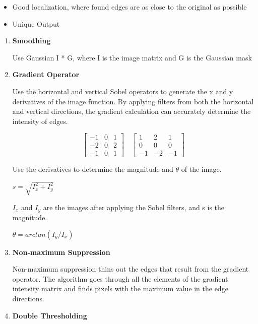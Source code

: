 \documentclass{article}
\begin{document}
\begin{multicols}{2}
\begin{itemize}
      \item Good localization, where found edges are as close to the original as possible
  
      \item Unique Output
\end{itemize}

\begin{enumerate}
        \item \textbf{Smoothing}
        
        Use Gaussian I * G, where I is the image matrix and G is the Gaussian mask
        \item \textbf{Gradient Operator}
        
        Use the horizontal and vertical Sobel operators to generate the x and y derivatives of the image function.
        By applying filters from both the horizontal and vertical directions, the gradient calculation can accurately determine the intensity of edges.

        \[
          \begin{bmatrix}
            -1 & 0 & 1\\
            -2 & 0 & 2\\
            -1 & 0 & 1
          \end{bmatrix}\quad
          \begin{bmatrix}
            1 & 2 & 1\\
            0 & 0 & 0\\
            -1 & -2 & -1
          \end{bmatrix}
        \]

        Use the derivatives to determine the magnitude and $\theta$ of the image.
        
        $s = \sqrt{I_x^2 + I_y^2}$

        $I_x$ and $I_y$ are the images after applying the Sobel filters, and s is the magnitude.

        $\theta = arctan(I_y/I_x)$

        \item \textbf{Non-maximum Suppression}
        
        Non-maximum suppression thins out the edges that result from the gradient operator.
        The algorithm goes through all the elements of the gradient intensity matrix and finds pixels with the maximum value in the edge directions.

        \item \textbf{Double Thresholding}
        

\end{enumerate}
\end{multicols}
\end{document}
